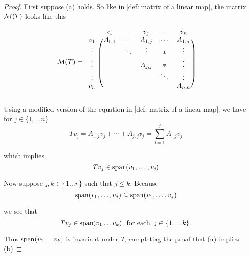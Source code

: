 \begin{proof}
  First suppose (a) holds. So like in \ref{def: matrix of a linear map}, the matrix $\mathcal{M}(T)$ looks like this

  \begin{minipage}{\linewidth}
  \begin{equation}
  \mathcal{M} (T) =
  \begin{blockarray}{cccccc}
    & v_1     & \cdots & v_j      & \cdots & v_n     \\
    \begin{block}{c(ccccc)}
      v_1    & A_{1,1} & \cdots & A_{1,j}  & \cdots & A_{1,n} \\
      \vdots &         & \ddots & \vdots   &   *    & \vdots  \\
      \vdots &         &        & A_{j,j}  &   *    & \vdots  \\
      \vdots &         &        &          & \ddots & \vdots  \\
      v_n    &         &        &          &        & A_{n,n} \\
    \end{block}
  \end{blockarray}
  \end{equation}
  \end{minipage}


  Using a modified version of the equation in \ref{def: matrix of a linear map}, we have for $j\in \{1, \ldots n \}$
  \begin{equation}
    T v_j = A_{1,j} v_j + \cdots + A_{j,j} v_j = \sum_{l=1}^{j} A_{l,j} v_j
  \end{equation}

  which implies
  \begin{equation}
    T v_j \in \operatorname{span} (v_1, \ldots, v_j)
  \end{equation}

  Now suppose $j, k \in \{1 \ldots n \}$ such that $j \leq  k.$ Because
  \begin{equation}
    \operatorname{span} (v_1, \ldots, v_j) \subseteq \operatorname{span} (v_1, \ldots, v_k)
  \end{equation}

  we see that
  \begin{equation}
    T v_j \in \operatorname{span} (v_1 \ldots v_k) \;\;\, \text{for each}\;\; j \in \{1 \ldots k\}.
  \end{equation}

  Thus $\operatorname{span} (v_1 \ldots v_k)$ is invariant under $T$, completing the proof that (a) implies (b)


\end{proof}
